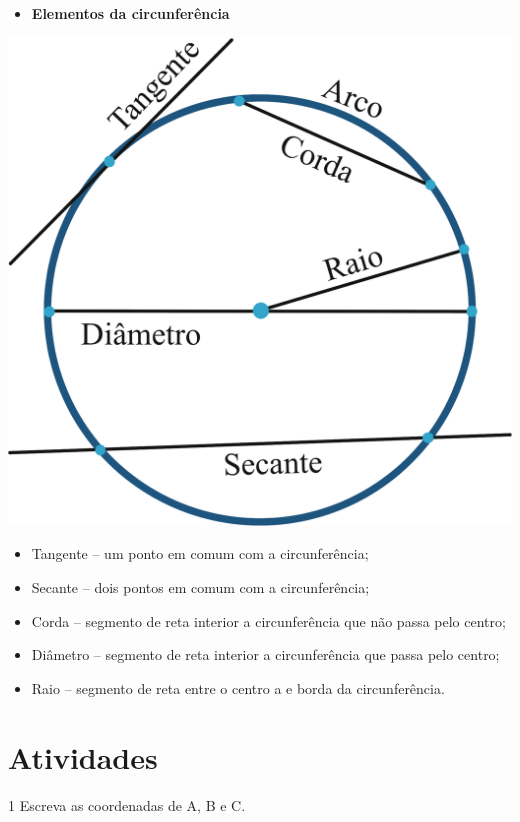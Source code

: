 {\begin{itemize}
  \item \textbf{Elementos da circunferência}
\end{itemize}

\includegraphics[width=.5\textwidth]{./ilustras-mat/modulo_10-elementos_da_circunferencia.png}

\begin{itemize}
\item
  Tangente -- um ponto em comum com a circunferência;
\item
  Secante -- dois pontos em comum com a circunferência;
\item
  Corda -- segmento de reta interior a circunferência que não passa pelo
  centro;
\item
  Diâmetro -- segmento de reta interior a circunferência que passa pelo
  centro;
\item
  Raio -- segmento de reta entre o centro a e borda da circunferência.
\end{itemize}
} 

\section{Atividades}

\num{1} Escreva as coordenadas de A, B e C.

